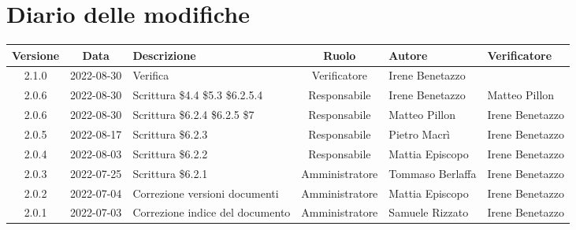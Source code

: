 \section*{Diario delle modifiche}
	\begin{center}
	\renewcommand{\arraystretch}{1.8} %
	\begin{longtable}{ |c|c|p{8em}|c|m{5em}|m{5em}| }
	\hline
	\textbf{Versione} & \textbf{Data} & \textbf{Descrizione} &  \textbf{Ruolo} &  \textbf{Autore} & \textbf{Verificatore}\\ %
	\hline %
	2.1.0 & 2022-08-30 & Verifica & Verificatore & Irene \newline Benetazzo & \\
	\hline 
	2.0.6 & 2022-08-30 & Scrittura \$4.4 \$5.3 \$6.2.5.4 & Responsabile & Irene \newline Benetazzo & Matteo \newline Pillon  \\	
	\hline
	2.0.6 & 2022-08-30 & Scrittura \$6.2.4 \$6.2.5 \$7 & Responsabile & Matteo \newline Pillon & Irene \newline Benetazzo  \\	
	\hline
	2.0.5 & 2022-08-17 & Scrittura \$6.2.3 & Responsabile & Pietro \newline Macrì & Irene \newline Benetazzo  \\	
	\hline
	2.0.4 & 2022-08-03 & Scrittura \$6.2.2 & Responsabile & Mattia \newline Episcopo & Irene \newline Benetazzo  \\	
	\hline
	2.0.3 & 2022-07-25 & Scrittura \$6.2.1 & Amministratore & Tommaso \newline Berlaffa & Irene \newline Benetazzo  \\
	\hline
	2.0.2 & 2022-07-04 & Correzione versioni documenti & Amministratore & Mattia \newline Episcopo & Irene \newline Benetazzo\\
	\hline
	2.0.1 & 2022-07-03 & Correzione indice del documento & Amministratore & Samuele \newline Rizzato & Irene \newline Benetazzo\\

\end{longtable}
\end{center}
